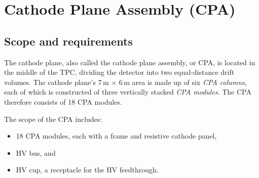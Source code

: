 


\section{Cathode Plane Assembly (CPA)}
\label{sec:cpa}

\subsection{Scope and requirements}

The cathode plane, also called the cathode plane assembly, or CPA, is located in the middle of the TPC, dividing the detector into two equal-distance drift volumes. The cathode plane's 7\,m $\times$ 6\,m area is made up of six \textit{CPA columns}, each of which is constructed of three vertically stacked \textit{CPA modules}. The CPA therefore consists of 18 CPA modules. 

The scope of the CPA includes:

\begin{itemize}
\item 18 CPA modules, each with a frame and resistive cathode panel, %
\item HV bus, and
\item HV cup, a receptacle for the HV feedthrough.
\end{itemize}


